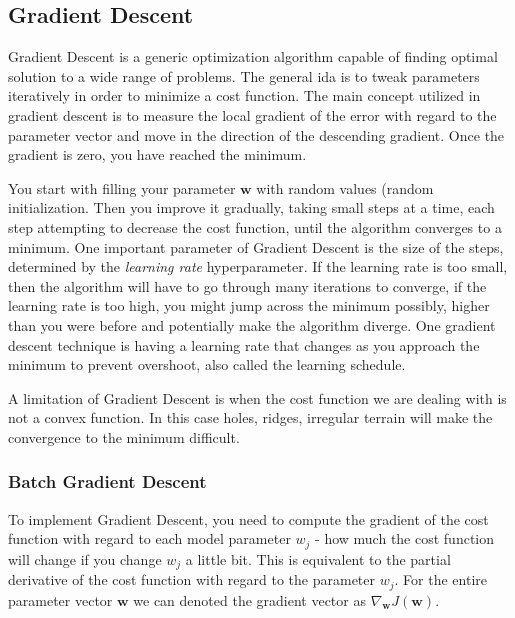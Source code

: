\documentclass[12pt]{article}
\begin{document}
    \subsection{Gradient Descent} \label{sec:GD}
        Gradient Descent is a generic optimization algorithm capable of finding optimal solution to a wide range of
        problems. The general ida is to tweak parameters iteratively in order to minimize a cost function. The main
        concept utilized in gradient descent is to measure the local gradient of the error with regard to the parameter
        vector and move in the direction of the descending gradient. Once the gradient is zero, you have reached the
        minimum.

        You start with filling your parameter $\boldsymbol{w}$ with random values (random initialization. Then you
        improve it gradually, taking small steps at a time, each step attempting to decrease the cost function, until
        the algorithm converges to a minimum. One important parameter of Gradient Descent is the size of the steps,
        determined by the \textit{learning rate} hyperparameter. If the learning rate is too small, then the algorithm
        will have to go through many iterations to converge, if the learning rate is too high, you might jump across the
        minimum possibly, higher than you were before and potentially make the algorithm diverge. One gradient descent
        technique is having a learning rate that changes as you approach the minimum to prevent overshoot, also called
        the learning schedule.

        A limitation of Gradient Descent is when the cost function we are dealing with is not a convex function. In this
        case holes, ridges, irregular terrain will make the convergence to the minimum difficult.

        \subsubsection{Batch Gradient Descent}
            To implement Gradient Descent, you need to compute the gradient of the cost function with regard to each
            model parameter $w_j$ - how much the cost function will change if you change $w_j$ a little bit. This is
            equivalent to the partial derivative of the cost function with regard to the parameter $w_j$. For the entire
            parameter vector $\boldsymbol{w}$ we can denoted the gradient vector as $\nabla_{\boldsymbol{w}}
            J(\boldsymbol{w})$.
\end{document}
